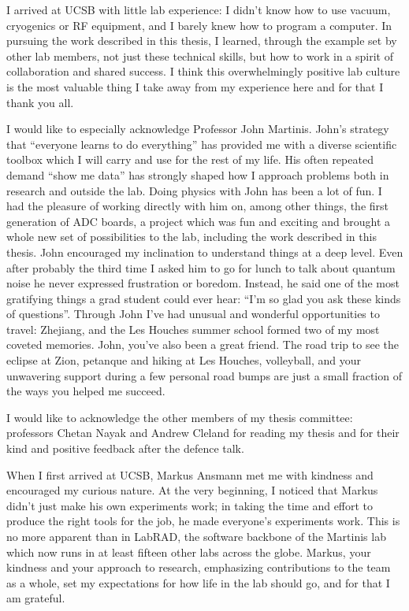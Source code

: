 \begin{acknowledgements}

I arrived at UCSB with little lab experience: I didn't know how to use vacuum, cryogenics or RF equipment, and I barely knew how to program a computer.
In pursuing the work described in this thesis, I learned, through the example set by other lab members, not just these technical skills, but how to work in a spirit of collaboration and shared success.
I think this overwhelmingly positive lab culture is the most valuable thing I take away from my experience here and for that I thank you all.

I would like to especially acknowledge Professor John Martinis.
John's strategy that ``everyone learns to do everything'' has provided me with a diverse scientific toolbox which I will carry and use for the rest of my life.
His often repeated demand ``show me data'' has strongly shaped how I approach problems both in research and outside the lab.
Doing physics with John has been a lot of fun.
I had the pleasure of working directly with him on, among other things, the first generation of ADC boards, a project which was fun and exciting and brought a whole new set of possibilities to the lab, including the work described in this thesis.
John encouraged my inclination to understand things at a deep level.
Even after probably the third time I asked him to go for lunch to talk about quantum noise he never expressed frustration or boredom.
Instead, he said one of the most gratifying things a grad student could ever hear: ``I'm so glad you ask these kinds of questions''.
Through John I've had unusual and wonderful opportunities to travel: Zhejiang, and the Les Houches summer school formed two of my most coveted memories.
John, you've also been a great friend.
The road trip to see the eclipse at Zion, petanque and hiking at Les Houches, volleyball, and your unwavering support during a few personal road bumps are just a small fraction of the ways you helped me succeed.

I would like to acknowledge the other members of my thesis committee: professors Chetan Nayak and Andrew Cleland for reading my thesis and for their kind and positive feedback after the defence talk.

When I first arrived at UCSB, Markus Ansmann met me with kindness and encouraged my curious nature.
At the very beginning, I noticed that Markus didn't just make his own experiments work; in taking the time and effort to produce the right tools for the job, he made everyone's experiments work.
This is no more apparent than in LabRAD, the software backbone of the Martinis lab which now runs in at least fifteen other labs across the globe.
Markus, your kindness and your approach to research, emphasizing contributions to the team as a whole, set my expectations for how life in the lab should go, and for that I am grateful.


\end{acknowledgements}
